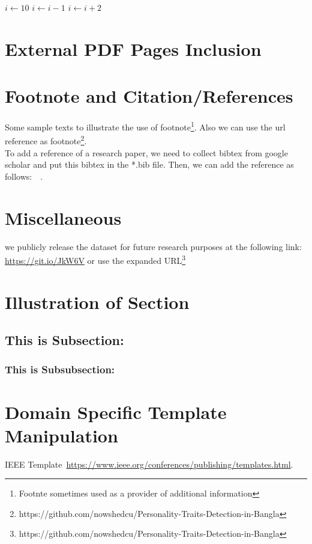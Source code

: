\documentclass[11pt]{article}
\begin{document}
\begin{algorithmic}
\STATE $i\gets 10$
        \STATE $i\gets i-1$
\ELSE
                \STATE $i\gets i+2$
        \ENDIF
\ENDIF 
\end{algorithmic}


\section{External PDF Pages Inclusion}
\label{ref:pdf}



\section{Footnote and Citation/References}
\label{ref:citation}

Some sample texts to illustrate the use of footnote\footnote{Footnte sometimes used as a provider of additional information}. Also we can use the url reference as footnote\footnote{https://github.com/nowshedcu/Personality-Traits-Detection-in-Bangla}.
\\

To add a reference of a research paper, we need to collect bibtex from google scholar and put this bibtex in the *.bib file. Then, we can add the reference as follows:~\cite{moniz2017nested}~\cite{kopka1995guide}.

%
\section{Miscellaneous}
\label{ref:miscellaneous}
we publicly release the dataset for future research purposes at the following link: \url{https://git.io/JkW6V} or use the expanded URL\footnote{https://github.com/nowshedcu/Personality-Traits-Detection-in-Bangla}


\section{Illustration of Section}
\label{ref:sectionLabel}

\subsection{This is Subsection:}
\label{ref:subsection}

\subsubsection{This is Subsubsection:}
\label{ref:subsubsection}

%

\section{Domain Specific Template Manipulation}
\label{ref:template}

IEEE Template~\url{https://www.ieee.org/conferences/publishing/templates.html}.




\end{document}
